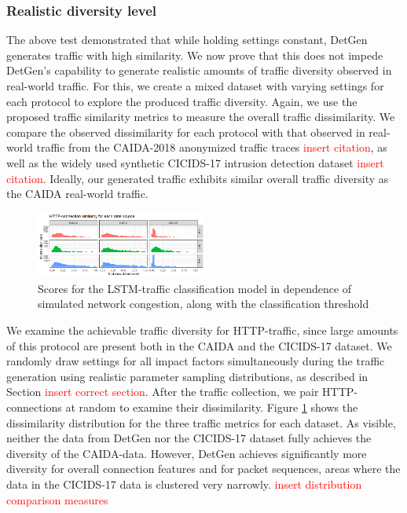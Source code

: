 \documentclass[sigconf]{acmart}
\begin{document}
\subsubsection{Realistic diversity level}

The above test demonstrated that while holding settings constant, DetGen generates traffic with high similarity. We now prove that this does not impede DetGen's capability to generate realistic amounts of traffic diversity observed in real-world traffic. For this, we create a mixed dataset with varying settings for each protocol to explore the produced traffic diversity. Again, we use the proposed traffic similarity metrics to measure the overall traffic dissimilarity. 
We compare the observed dissimilarity for each protocol with that observed in real-world traffic from the CAIDA-2018 anonymized traffic traces \textcolor{red}{insert citation}, as well as the widely used synthetic CICIDS-17 intrusion detection dataset \textcolor{red}{insert citation}. Ideally, our generated traffic exhibits similar overall traffic diversity as the CAIDA real-world traffic.



\begin{figure}
\centering
\includegraphics[width=0.5\textwidth]{images/HTTP_similarity.png}
\caption{Scores for the LSTM-traffic classification model in dependence of simulated network congestion, along with the classification threshold}\label{fig:diversity_exp}
\end{figure}

We examine the achievable traffic diversity for HTTP-traffic, since large amounts of this protocol are present both in the CAIDA and the CICIDS-17 dataset.
We randomly draw settings for all impact factors simultaneously during the traffic generation using realistic parameter sampling distributions, as described in Section \textcolor{red}{insert correct section}. After the traffic collection, we pair HTTP-connections at random to examine their dissimilarity. Figure \ref{fig:diversity_exp} shows the dissimilarity distribution for the three traffic metrics for each dataset. As visible, neither the data from DetGen nor the CICIDS-17 dataset fully achieves the diversity of the CAIDA-data. However, DetGen achieves significantly more diversity for overall connection features and for packet sequences, areas where the data in the CICIDS-17 data is clustered very narrowly. \textcolor{red}{insert distribution comparison measures}
\end{document}
